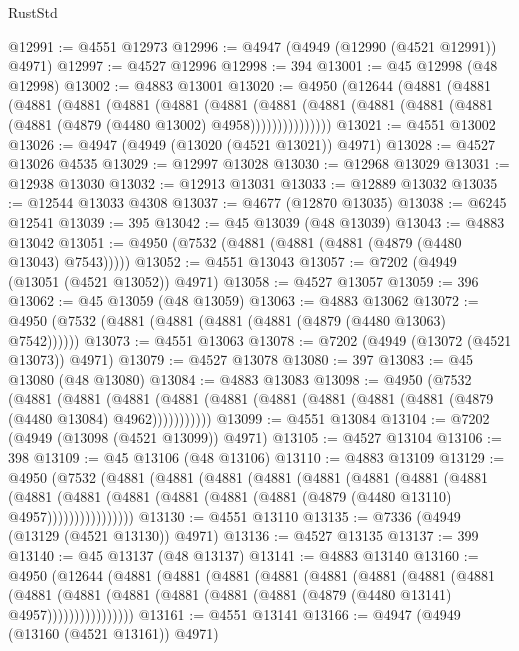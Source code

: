 \begin{lexlean}{RustStd}
\begin{coremodule}
@12991 := @4551 @12973
@12996 := @4947 (@4949 (@12990 (@4521 @12991)) @4971)
@12997 := @4527 @12996
@12998 := 394
@13001 := @45 @12998 (@48 @12998)
@13002 := @4883 @13001
@13020 := @4950
    (@12644
      (@4881
        (@4881
          (@4881
            (@4881
              (@4881
                (@4881
                  (@4881
                    (@4881
                      (@4881 (@4881 (@4881 (@4881 (@4881 (@4879 (@4480 @13002) @4958)))))))))))))))
@13021 := @4551 @13002
@13026 := @4947 (@4949 (@13020 (@4521 @13021)) @4971)
@13028 := @4527 @13026 @4535
@13029 := @12997 @13028
@13030 := @12968 @13029
@13031 := @12938 @13030
@13032 := @12913 @13031
@13033 := @12889 @13032
@13035 := @12544 @13033 @4308
@13037 := @4677 (@12870 @13035)
@13038 := @6245 @12541
@13039 := 395
@13042 := @45 @13039 (@48 @13039)
@13043 := @4883 @13042
@13051 := @4950 (@7532 (@4881 (@4881 (@4881 (@4879 (@4480 @13043) @7543)))))
@13052 := @4551 @13043
@13057 := @7202 (@4949 (@13051 (@4521 @13052)) @4971)
@13058 := @4527 @13057
@13059 := 396
@13062 := @45 @13059 (@48 @13059)
@13063 := @4883 @13062
@13072 := @4950 (@7532 (@4881 (@4881 (@4881 (@4881 (@4879 (@4480 @13063) @7542))))))
@13073 := @4551 @13063
@13078 := @7202 (@4949 (@13072 (@4521 @13073)) @4971)
@13079 := @4527 @13078
@13080 := 397
@13083 := @45 @13080 (@48 @13080)
@13084 := @4883 @13083
@13098 := @4950
    (@7532
      (@4881
        (@4881
          (@4881 (@4881 (@4881 (@4881 (@4881 (@4881 (@4881 (@4879 (@4480 @13084) @4962)))))))))))
@13099 := @4551 @13084
@13104 := @7202 (@4949 (@13098 (@4521 @13099)) @4971)
@13105 := @4527 @13104
@13106 := 398
@13109 := @45 @13106 (@48 @13106)
@13110 := @4883 @13109
@13129 := @4950
    (@7532
      (@4881
        (@4881
          (@4881
            (@4881
              (@4881
                (@4881
                  (@4881
                    (@4881
                      (@4881
                        (@4881
                          (@4881 (@4881 (@4881 (@4881 (@4879 (@4480 @13110) @4957))))))))))))))))
@13130 := @4551 @13110
@13135 := @7336 (@4949 (@13129 (@4521 @13130)) @4971)
@13136 := @4527 @13135
@13137 := 399
@13140 := @45 @13137 (@48 @13137)
@13141 := @4883 @13140
@13160 := @4950
    (@12644
      (@4881
        (@4881
          (@4881
            (@4881
              (@4881
                (@4881
                  (@4881
                    (@4881
                      (@4881
                        (@4881
                          (@4881 (@4881 (@4881 (@4881 (@4879 (@4480 @13141) @4957))))))))))))))))
@13161 := @4551 @13141
@13166 := @4947 (@4949 (@13160 (@4521 @13161)) @4971)

\end{coremodule}
\end{lexlean}
